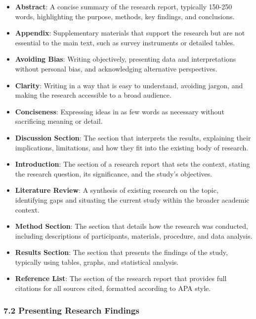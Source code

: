 \documentclass[
]{book}
\providecommand{\tightlist}{%
  \setlength{\itemsep}{0pt}\setlength{\parskip}{0pt}}
\begin{document}
\begin{itemize}
\tightlist
\item
  \textbf{Abstract}: A concise summary of the research report, typically 150-250 words, highlighting the purpose, methods, key findings, and conclusions.
\item
  \textbf{Appendix}: Supplementary materials that support the research but are not essential to the main text, such as survey instruments or detailed tables.
\item
  \textbf{Avoiding Bias}: Writing objectively, presenting data and interpretations without personal bias, and acknowledging alternative perspectives.
\item
  \textbf{Clarity}: Writing in a way that is easy to understand, avoiding jargon, and making the research accessible to a broad audience.
\item
  \textbf{Conciseness}: Expressing ideas in as few words as necessary without sacrificing meaning or detail.
\item
  \textbf{Discussion Section}: The section that interprets the results, explaining their implications, limitations, and how they fit into the existing body of research.
\item
  \textbf{Introduction}: The section of a research report that sets the context, stating the research question, its significance, and the study's objectives.
\item
  \textbf{Literature Review}: A synthesis of existing research on the topic, identifying gaps and situating the current study within the broader academic context.
\item
  \textbf{Method Section}: The section that details how the research was conducted, including descriptions of participants, materials, procedure, and data analysis.
\item
  \textbf{Results Section}: The section that presents the findings of the study, typically using tables, graphs, and statistical analysis.
\item
  \textbf{Reference List}: The section of the research report that provides full citations for all sources cited, formatted according to APA style.
\end{itemize}

\subsubsection*{\texorpdfstring{\textbf{7.2 Presenting Research Findings}}{7.2 Presenting Research Findings}}\label{presenting-research-findings}
\end{document}
